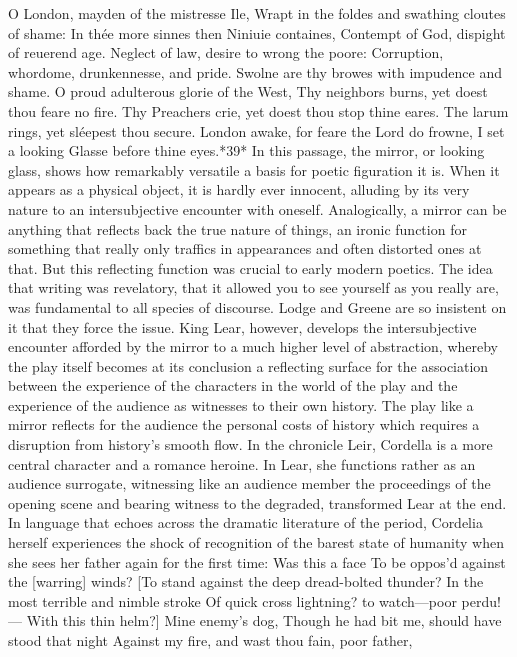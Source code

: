 O London, mayden of the mistresse Ile,
Wrapt in the foldes and swathing cloutes of shame:
In thée more sinnes then Niniuie containes,
Contempt of God, dispight of reuerend age.
Neglect of law, desire to wrong the poore:
Corruption, whordome, drunkennesse, and pride.
Swolne are thy browes with impudence and shame.
O proud adulterous glorie of the West,
Thy neighbors burns, yet doest thou feare no fire.
Thy Preachers crie, yet doest thou stop thine eares.
The larum rings, yet sléepest thou secure.
London awake, for feare the Lord do frowne,
I set a looking Glasse before thine eyes.*39*
In this passage, the mirror, or looking glass, shows how remarkably versatile a basis for poetic figuration it is. When it appears as a physical object, it is hardly ever innocent, alluding by its very nature to an intersubjective encounter with oneself. Analogically, a mirror can be anything that reflects back the true nature of things, an ironic function for something that really only traffics in appearances and often distorted ones at that. But this reflecting function was crucial to early modern poetics. The idea that writing was revelatory, that it allowed you to see yourself as you really are, was fundamental to all species of discourse. Lodge and Greene are so insistent on it that they force the issue. King Lear, however, develops the intersubjective encounter afforded by the mirror to a much higher level of abstraction, whereby the play itself becomes at its conclusion a reflecting surface for the association between the experience of the characters in the world of the play and the experience of the audience as witnesses to their own history. The play like a mirror reflects for the audience the personal costs of history which requires a disruption from history's smooth flow. In the chronicle Leir, Cordella is a more central character and a romance heroine. In Lear, she functions rather as an audience surrogate, witnessing like an audience member the proceedings of the opening scene and bearing witness to the degraded, transformed Lear at the end. In language that echoes across the dramatic literature of the period, Cordelia herself experiences the shock of recognition of the barest state of humanity when she sees her father again for the first time:
Was this a face
To be oppos'd against the [warring] winds?
[To stand against the deep dread-bolted thunder?
In the most terrible and nimble stroke
Of quick cross lightning? to watch—poor perdu!—
With this thin helm?] Mine enemy's dog,
Though he had bit me, should have stood that night
Against my fire, and wast thou fain, poor father,
